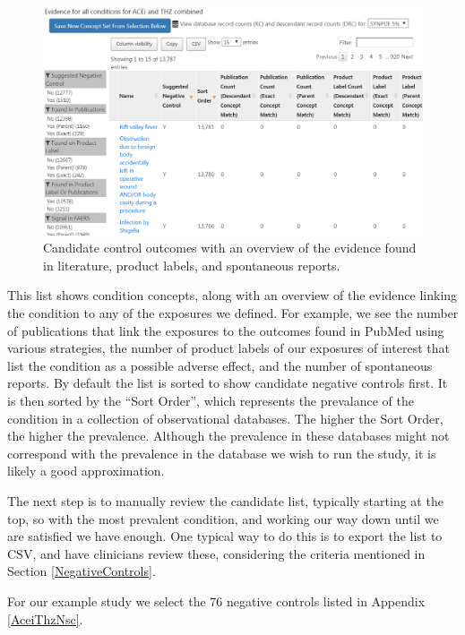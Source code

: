 \documentclass[11pt]{book}
\begin{document}
\begin{figure}

{\centering \includegraphics[width=1\linewidth]{images/MethodValidity/candidateNcs} 

}

\caption{Candidate control outcomes with an overview of the evidence found in literature, product labels, and spontaneous reports.}\label{fig:candidateNcs}
\end{figure}

This list shows condition concepts, along with an overview of the
evidence linking the condition to any of the exposures we defined. For
example, we see the number of publications that link the exposures to
the outcomes found in PubMed using various strategies, the number of
product labels of our exposures of interest that list the condition as a
possible adverse effect, and the number of spontaneous reports. By
default the list is sorted to show candidate negative controls first. It
is then sorted by the ``Sort Order'', which represents the prevalance of
the condition in a collection of observational databases. The higher the
Sort Order, the higher the prevalence. Although the prevalence in these
databases might not correspond with the prevalence in the database we
wish to run the study, it is likely a good approximation.

The next step is to manually review the candidate list, typically
starting at the top, so with the most prevalent condition, and working
our way down until we are satisfied we have enough. One typical way to
do this is to export the list to CSV, and have clinicians review these,
considering the criteria mentioned in Section \ref{NegativeControls}.

For our example study we select the 76 negative controls listed in
Appendix \ref{AceiThzNsc}.
\end{document}
